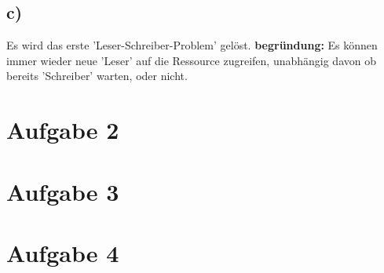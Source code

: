\documentclass[11pt,a4paper,DIV=10,]{scrartcl}
\begin{document}
\subsection*{c)}
Es wird das erste 'Leser-Schreiber-Problem' gelöst. \textbf{begründung:} Es können immer wieder neue 'Leser' auf die Ressource zugreifen, unabhängig davon ob bereits 'Schreiber' warten, oder nicht.
\section*{Aufgabe 2}
\section*{Aufgabe 3}
\section*{Aufgabe 4}


\end{document}

